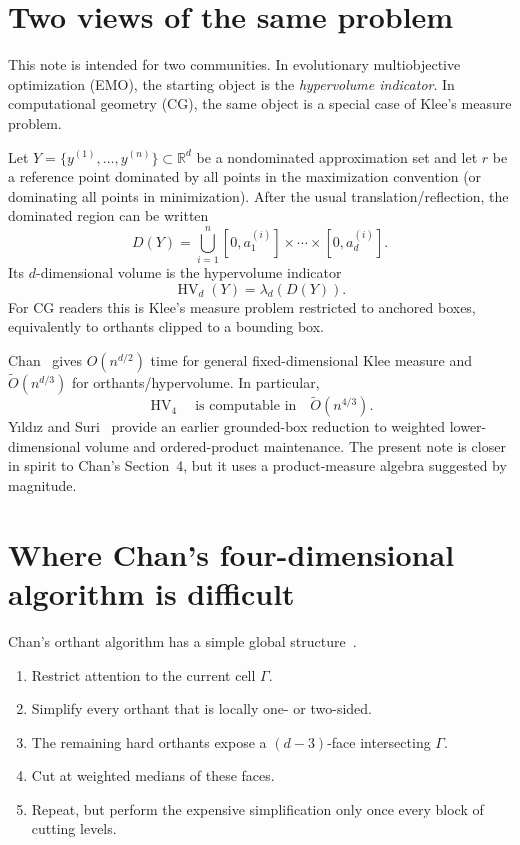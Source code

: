 \documentclass[12pt,a4paper]{article}
\theoremstyle{definition}
\newcommand{\HV}{\operatorname{HV}}
\newcommand{\1}{\mathbf 1}
\newcommand{\R}{\mathbb R}
\newcommand{\wtO}{\widetilde O}
\begin{document}
\section{Two views of the same problem}

This note is intended for two communities. In evolutionary multiobjective optimization (EMO), the starting object is the \emph{hypervolume indicator}. In computational geometry (CG), the same object is a special case of Klee's measure problem.

Let $Y=\{y^{(1)},\dots,y^{(n)}\}\subset\R^d$ be a nondominated approximation set and let $r$ be a reference point dominated by all points in the maximization convention (or dominating all points in minimization). After the usual translation/reflection, the dominated region can be written
\[
D(Y)=\bigcup_{i=1}^n [0,a^{(i)}_1]\times\cdots\times[0,a^{(i)}_d].
\]
Its $d$-dimensional volume is the hypervolume indicator
\[
\HV_d(Y)=\lambda_d(D(Y)).
\]
For CG readers this is Klee's measure problem restricted to anchored boxes, equivalently to orthants clipped to a bounding box.

Chan~\cite{Chan2013} gives $O(n^{d/2})$ time for general fixed-dimensional Klee measure and $\wtO(n^{d/3})$ for orthants/hypervolume. In particular,
\[
\HV_4\quad\text{is computable in}\quad \wtO(n^{4/3}).
\]
Y\i ld\i z and Suri~\cite{YildizSuri2012} provide an earlier grounded-box reduction to weighted lower-dimensional volume and ordered-product maintenance. The present note is closer in spirit to Chan's Section~4, but it uses a product-measure algebra suggested by magnitude.

\section{Where Chan's four-dimensional algorithm is difficult}

Chan's orthant algorithm has a simple global structure~\cite{Chan2013}.

\begin{enumerate}
\item Restrict attention to the current cell $\Gamma$.
\item Simplify every orthant that is locally one- or two-sided.
\item The remaining hard orthants expose a $(d-3)$-face intersecting $\Gamma$.
\item Cut at weighted medians of these faces.
\item Repeat, but perform the expensive simplification only once every block of cutting levels.
\end{enumerate}
\end{document}
